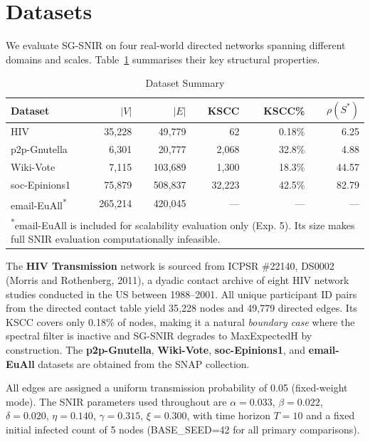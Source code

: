 \documentclass[conference]{IEEEtran}
\begin{document}
\section{Datasets}
\label{sec:datasets}

We evaluate SG-SNIR on four real-world directed networks spanning different domains and scales. Table~\ref{tab:datasets} summarises their key structural properties.

\begin{table}[htbp]
\caption{Dataset Summary}
\label{tab:datasets}
\centering
\begin{tabular}{lrrrrr}
\hline
\textbf{Dataset} & $|V|$ & $|E|$ & \textbf{KSCC} & \textbf{KSCC\%} & $\rho(S^*)$ \\
\hline
HIV & 35{,}228 & 49{,}779 & 62 & 0.18\% & 6.25 \\
p2p-Gnutella & 6{,}301 & 20{,}777 & 2{,}068 & 32.8\% & 4.88 \\
Wiki-Vote & 7{,}115 & 103{,}689 & 1{,}300 & 18.3\% & 44.57 \\
soc-Epinions1 & 75{,}879 & 508{,}837 & 32{,}223 & 42.5\% & 82.79 \\
email-EuAll\textsuperscript{*} & 265{,}214 & 420{,}045 & --- & --- & --- \\
\multicolumn{6}{p{0.95\columnwidth}}{\small \textsuperscript{*}email-EuAll is included for scalability evaluation only (Exp. 5). Its size makes full SNIR evaluation computationally infeasible.} \\
\hline
\end{tabular}
\end{table}

The \textbf{HIV Transmission} network is sourced from ICPSR \#22140, DS0002 (Morris and Rothenberg, 2011), a dyadic contact archive of eight HIV network studies conducted in the US between 1988--2001. All unique participant ID pairs from the directed contact table yield 35{,}228 nodes and 49{,}779 directed edges. Its KSCC covers only 0.18\% of nodes, making it a natural \emph{boundary case} where the spectral filter is inactive and SG-SNIR degrades to MaxExpectedH by construction. The \textbf{p2p-Gnutella}, \textbf{Wiki-Vote}, \textbf{soc-Epinions1}, and \textbf{email-EuAll} datasets are obtained from the SNAP collection.

All edges are assigned a uniform transmission probability of 0.05 (fixed-weight mode). The SNIR parameters used throughout are $\alpha=0.033$, $\beta=0.022$, $\delta=0.020$, $\eta=0.140$, $\gamma=0.315$, $\xi=0.300$, with time horizon $T=10$ and a fixed initial infected count of 5 nodes (BASE\_SEED=42 for all primary comparisons).
\end{document}
